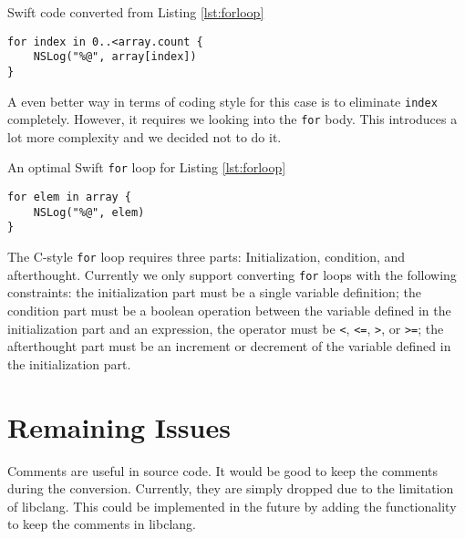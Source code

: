 \documentclass{sfuthesis}
\begin{document}
\begin{listing}[H]
\caption{Swift code converted from Listing \ref{lst:forloop}}
\begin{verbatim}
for index in 0..<array.count {
    NSLog("%@", array[index])
}
\end{verbatim}
\end{listing}

A even better way in terms of coding style for this case is to eliminate \texttt{index} completely. However, it requires we looking into the \texttt{for} body. This introduces a lot more complexity and we decided not to do it.

\begin{listing}[H]
\caption{An optimal Swift \texttt{for} loop for Listing \ref{lst:forloop}}
\begin{verbatim}
for elem in array {
    NSLog("%@", elem)
}
\end{verbatim}
\end{listing}

The C-style \texttt{for} loop requires three parts: Initialization, condition, and afterthought. Currently we only support converting \texttt{for} loops with the following constraints: the initialization part must be a single variable definition; the condition part must be a boolean operation between the variable defined in the initialization part and an expression, the operator must be \texttt{<}, \texttt{<=}, \texttt{>}, or \texttt{>=}; the afterthought part must be an increment or decrement of the variable defined in the initialization part.


%
%
%


\section{Remaining Issues}


Comments are useful in source code. It would be good to keep the comments during the conversion. Currently, they are simply dropped due to the limitation of libclang. This could be implemented in the future by adding the functionality to keep the comments in libclang.
\end{document}
